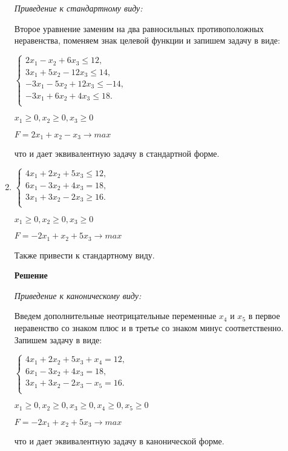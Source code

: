 \documentclass[12pt]{article}
\begin{document}
\begin{enumerate}
\textit{Приведение к стандартному виду:}

Второе уравнение заменим на два равносильных противоположных неравенства, поменяем знак целевой функции и запишем задачу в виде:
\begin{center}

$\begin{cases}
  2x_1 -x_2+6x_3 \le 12,\\ 
 3x_1 +5x_2 - 12x_3 \le 14,\\
 -3x_1 -5x_2 + 12x_3 \le - 14,\\
 -3x_1 +6x_2 +4x_3 \le18.\\
\end{cases}$

$x_1\ge0, x_2\ge0, x_3\ge0$

$F=2x_1+x_2 -x_3 \rightarrow max$\end{center}
что и дает эквивалентную задачу в стандартной форме.

\newpage
\item
\begin{center}
$\begin{cases}
  4x_1 +2x_2+5x_3 \le 12,\\ 
 6x_1 -3x_2 +4x_3 = 18,\\
 3x_1 +3x_2 -2x_3\ge16.\\
\end{cases}$

$x_1\ge0, x_2\ge0, x_3\ge0$

$F=-2x_1+x_2 +5x_3 \rightarrow max$

Также привести к стандартному виду.
\end{center}

\textbf{Решение}

\textit{Приведение к каноническому виду:}

Введем дополнительные неотрицательные переменные $x_4$ и $ x_5$ в первое неравенство со знаком плюс и в третье со знаком минус соответственно. Запишем задачу в виде:
\begin{center}
$\begin{cases}
  4x_1 +2x_2+5x_3 +x_4 = 12,\\ 
 6x_1 -3x_2 +4x_3 = 18,\\
 3x_1 +3x_2 -2x_3-x_5=16.\\
\end{cases}$

$x_1\ge0, x_2\ge0, x_3\ge0, x_4\ge0, x_5\ge0$

$F=-2x_1+x_2 +5x_3 \rightarrow max$
\end{center}
что и дает эквивалентную задачу в канонической форме.


\end{enumerate}
\end{document}
